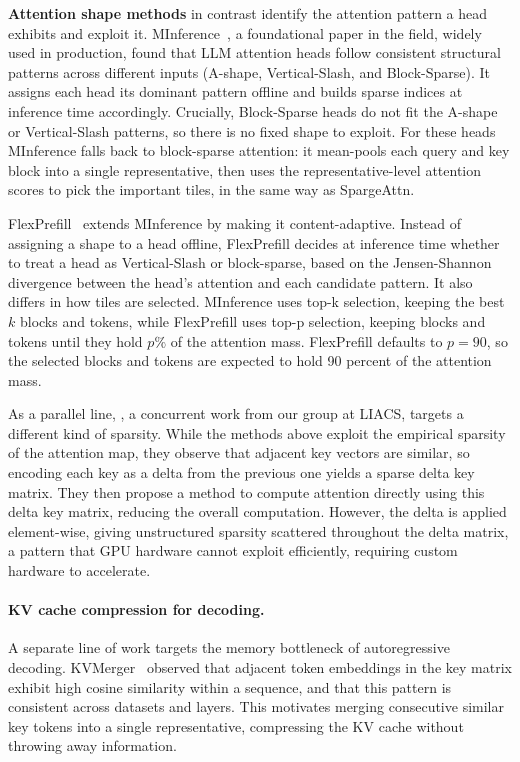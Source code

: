 \textbf{Attention shape methods} in contrast identify the attention pattern a head exhibits and exploit it. MInference~\citep{jiang2024minference}, a foundational paper in the field, widely used in production, found that LLM attention heads follow consistent structural patterns across different inputs (A-shape, Vertical-Slash, and Block-Sparse). It assigns each head its dominant pattern offline and builds sparse indices at inference time accordingly. Crucially, Block-Sparse heads do not fit the A-shape or Vertical-Slash patterns, so there is no fixed shape to exploit. For these heads MInference falls back to block-sparse attention: it mean-pools each query and key block into a single representative, then uses the representative-level attention scores to pick the important tiles, in the same way as SpargeAttn.

FlexPrefill~\citep{lai2025flexprefill} extends MInference by making it content-adaptive. Instead of assigning a shape to a head offline, FlexPrefill decides at inference time whether to treat a head as Vertical-Slash or block-sparse, based on the Jensen-Shannon divergence between the head's attention and each candidate pattern. It also differs in how tiles are selected. MInference uses top-k selection, keeping the best $k$ blocks and tokens, while FlexPrefill uses top-p selection, keeping blocks and tokens until they hold $p\%$ of the attention mass. FlexPrefill defaults to $p=90$, so the selected blocks and tokens are expected to hold 90 percent of the attention mass.


As a parallel line, \citet{qi2024deltallm}, a concurrent work from our group at LIACS, targets a different kind of sparsity.
While the methods above exploit the empirical sparsity of the attention map, they observe that adjacent key vectors are similar, so encoding each key as a delta from the previous one yields a sparse delta key matrix.
They then propose a method to compute attention directly using this delta key matrix, reducing the overall computation.
However, the delta is applied element-wise, giving unstructured sparsity scattered throughout the delta matrix, a pattern that GPU hardware cannot exploit efficiently, requiring custom hardware to accelerate.

\paragraph{KV cache compression for decoding.}
A separate line of work targets the memory bottleneck of autoregressive decoding.
KVMerger~\citep{wang2024kvmerger} observed that adjacent token embeddings in the key matrix exhibit high cosine similarity within a sequence, and that this pattern is consistent across datasets and layers. This motivates merging consecutive similar key tokens into a single representative, compressing the KV cache without throwing away information.

